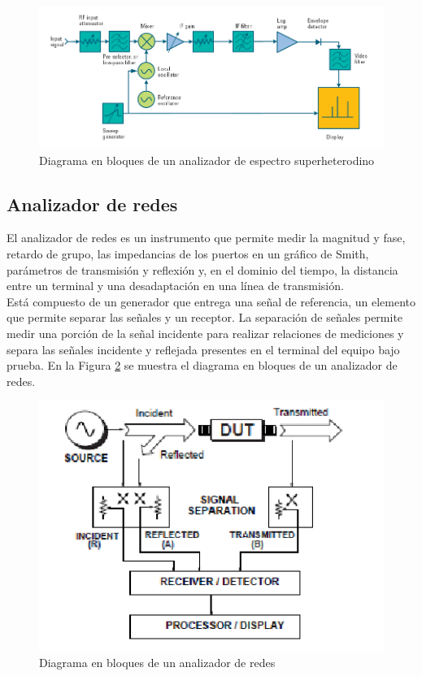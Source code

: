 \documentclass[a4paper,10pt]{article}
\begin{document}
	\begin{figure}[!htb]
		\centering
		\includegraphics[width=12cm]
		{Imagenes/diagram.png}
		\caption{Diagrama en bloques de un analizador de espectro 
		superheterodino}
		\label{diagramadebloques} 
	\end{figure}
	
	\newpage
	\subsection{Analizador de redes}
	\indent El analizador de redes es un instrumento que permite medir la 
	magnitud y fase, retardo de grupo, las impedancias de los 
	puertos en un gr\'afico de Smith, par\'ametros de transmisi\'on y reflexi\'on y, en 
	el dominio del tiempo, la distancia entre un terminal y una desadaptaci\'on en
	una l\'inea de transmisi\'on. \\
	\indent Est\'a compuesto de un generador que entrega una se\~nal de referencia, 
	un elemento que permite separar las se\~nales y un receptor. La separaci\'on de 
	se\~nales permite medir una porci\'on de la se\~nal incidente para realizar 
	relaciones de mediciones y separa las se\~nales incidente y reflejada 
	presentes en el terminal del equipo bajo prueba. En la Figura \ref{img:001} 
	se muestra el diagrama en bloques de un analizador de redes.

	\begin{figure}[!htb]
		\centering
		\includegraphics[width=12cm]
		{Imagenes/diagAnalRedes.png}
		\caption{Diagrama en bloques de un analizador de redes}
		\label{img:001} 
	\end{figure}
\end{document}
